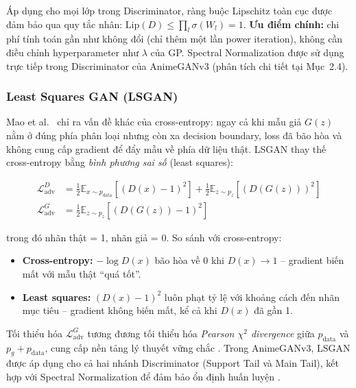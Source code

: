 Áp dụng cho mọi lớp trong Discriminator, ràng buộc Lipschitz toàn cục được đảm bảo qua quy tắc nhân: $\text{Lip}(D) \leq \prod_l \sigma(W_l) = 1$. \textbf{Ưu điểm chính:} chi phí tính toán gần như không đổi (chỉ thêm một lần power iteration), không cần điều chỉnh hyperparameter như $\lambda$ của GP. Spectral Normalization được sử dụng trực tiếp trong Discriminator của AnimeGANv3 \cite{Liu2024} (phân tích chi tiết tại Mục~2.4).

\subsubsection{Least Squares GAN (LSGAN)}
\label{subsubsec:lsgan}

Mao et al.~\cite{Mao2017} chỉ ra vấn đề khác của cross-entropy: ngay cả khi mẫu giả $G(z)$ nằm ở đúng phía phân loại nhưng còn xa decision boundary, loss đã bão hòa và không cung cấp gradient để đẩy mẫu về phía dữ liệu thật. LSGAN thay thế cross-entropy bằng \textit{bình phương sai số} (least squares):

\begin{align}
\label{eq:lsgan_D}
\mathcal{L}_{\text{adv}}^D &= \frac{1}{2}\mathbb{E}_{x \sim p_{\text{data}}}\!\left[\left(D(x) - 1\right)^2\right] + \frac{1}{2}\mathbb{E}_{z \sim p_z}\!\left[\left(D(G(z))\right)^2\right] \\
\label{eq:lsgan_G}
\mathcal{L}_{\text{adv}}^G &= \frac{1}{2}\mathbb{E}_{z \sim p_z}\!\left[\left(D(G(z)) - 1\right)^2\right]
\end{align}

\noindent trong đó nhãn thật = 1, nhãn giả = 0. So sánh với cross-entropy:
\begin{itemize}
    \item \textbf{Cross-entropy:} $-\log D(x)$ bão hòa về 0 khi $D(x) \to 1$ -- gradient biến mất với mẫu thật ``quá tốt''.
    \item \textbf{Least squares:} $(D(x)-1)^2$ luôn phạt tỷ lệ với khoảng cách đến nhãn mục tiêu -- gradient không biến mất, kể cả khi $D(x)$ đã gần 1.
\end{itemize}

Tối thiểu hóa $\mathcal{L}_{\text{adv}}^G$ tương đương tối thiểu hóa \textit{Pearson $\chi^2$ divergence} giữa $p_{\text{data}}$ và $p_g + p_{\text{data}}$, cung cấp nền tảng lý thuyết vững chắc \cite{Mao2017}. Trong AnimeGANv3, LSGAN được áp dụng cho cả hai nhánh Discriminator (Support Tail và Main Tail), kết hợp với Spectral Normalization để đảm bảo ổn định huấn luyện \cite{Liu2024}.


